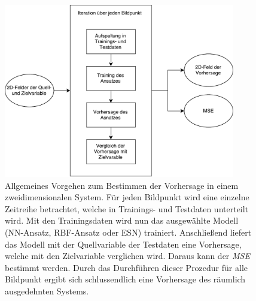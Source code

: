\begin{appendices}
\begin{figure}[h]
	\centering
	\includegraphics[width=0.9\textwidth]{figures/illustrations/general_predicition_flow_chart.pdf}
  	\caption{Allgemeines Vorgehen zum Bestimmen der Vorhersage in einem zweidimensionalen System. Für jeden Bildpunkt wird eine einzelne Zeitreihe betrachtet, welche in Trainings- und Testdaten unterteilt wird. Mit den Trainingsdaten wird nun das ausgewählte Modell (\textsc{NN}-Ansatz, \textsc{RBF}-Ansatz oder \textsc{ESN}) trainiert. Anschließend liefert das Modell mit der Quellvariable der Testdaten eine Vorhersage, welche mit den Zielvariable verglichen wird. Daraus kann der \textit{MSE} bestimmt werden. Durch das Durchführen dieser Prozedur für alle Bildpunkt ergibt sich schlussendlich eine Vorhersage des räumlich ausgedehnten Systems.}
  	  \label{fig:apx_general_prediction_flowchart}
\end{figure}%

\end{appendices}